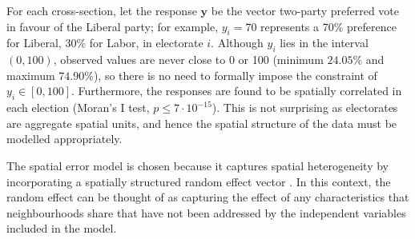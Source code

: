 \documentclass[times, doublespace]{anzsauth}
\begin{document}
For each cross-section, let the response \(\bm{y}\) be the vector two-party preferred vote in favour of the Liberal party; for example, \(y_i = 70\) represents a 70\% preference for Liberal, 30\% for Labor, in electorate \(i\). Although \(y_i\) lies in the interval \((0,100)\), observed values are never close to 0 or 100 (minimum \(24.05 \%\) and maximum \(74.90 \%\)), so there is no need to formally impose the constraint of \(y_i \in [0,100]\). Furthermore, the responses are found to be spatially correlated in each election (Moran's I test, \(p \le 7\cdot10^{-15}\)). This is not surprising as electorates are aggregate spatial units, and hence the spatial structure of the data must be modelled appropriately.

The spatial error model \citep{Anselin88} is chosen because it captures spatial heterogeneity by incorporating a spatially structured random effect vector \citep{LeSage2009}. In this context, the random effect can be thought of as capturing the effect of any characteristics that neighbourhoods share that have not been addressed by the independent variables included in the model.
\end{document}
